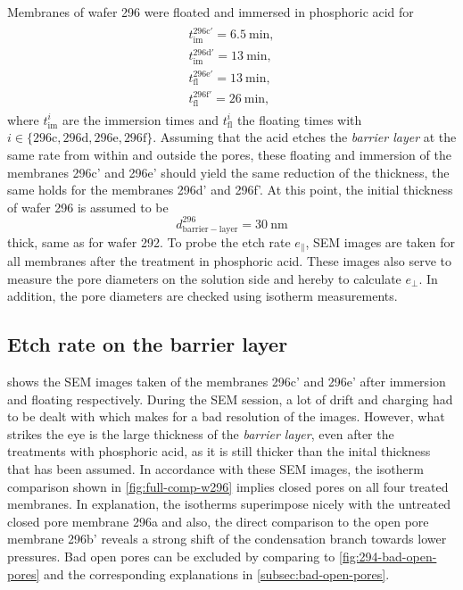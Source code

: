 \documentclass[../thesis.tex]{subfiles}
\begin{document}
        Membranes of wafer 296 were floated and immersed in phosphoric acid for
        \begin{align*}
            \begin{split}
                t_\mathrm{im}^\mathrm{296c'}=\SI{6,5}{\minute}, \\
                t_\mathrm{im}^\mathrm{296d'}=\SI{13}{\minute},  \\
                t_\mathrm{fl}^\mathrm{296e'}=\SI{13}{\minute}, \\
                t_\mathrm{fl}^\mathrm{296f'}=\SI{26}{\minute},
            \end{split}
        \end{align*}
        where $t_\mathrm{im}^{i}$ are the immersion times and $t_\mathrm{fl}^{i}$ the floating times with $i\in \{ \mathrm{296c,296d,296e,296f}\}$. Assuming that the acid etches the \textit{barrier layer} at the same rate from within and outside the pores, these floating and immersion of the membranes 296c' and 296e' should yield the same reduction of the thickness, the same holds for the membranes 296d' and 296f'. At this point, the initial thickness of wafer 296 is assumed to be
        \begin{equation*}
          d_\mathrm{barrier-layer}^\mathrm{296} =\SI{30}{\nano\meter}
        \end{equation*}
        thick, same as for wafer 292. To probe the etch rate $e_\parallel$, SEM images are taken for all membranes after the treatment in phosphoric acid. These images also serve to measure the pore diameters on the solution side and hereby to calculate $e_\perp$. In addition, the pore diameters are checked using isotherm measurements.


        \subsection{Etch rate on the barrier layer}
        \label{subsec:etch-rate}

          

           shows the SEM images taken of the membranes 296c' and 296e' after immersion and floating respectively. During the SEM session, a lot of drift and charging had to be dealt with which makes for a bad resolution of the images. However, what strikes the eye is the large thickness of the \textit{barrier layer}, even after the treatments with phosphoric acid, as it is still thicker than the inital thickness that has been assumed. In accordance with these SEM images, the isotherm comparison shown in \cref{fig:full-comp-w296} implies closed pores on all four treated membranes. In explanation, the isotherms superimpose nicely with the untreated closed pore membrane 296a and also, the direct comparison to the open pore membrane 296b' reveals a strong shift of the condensation branch towards lower pressures. Bad open pores can be excluded by comparing to \cref{fig:294-bad-open-pores} and the corresponding explanations in \cref{subsec:bad-open-pores}.
\end{document}
